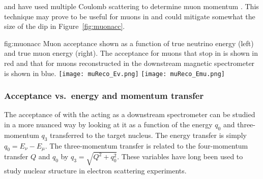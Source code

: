  and  have used multiple Coulomb scattering to determine muon momentum \cite{Abratenko:2017nki}.  
This technique may prove to be useful for muons in  and could  mitigate somewhat the size of the dip in Figure~\ref{fig:muonacc}.   


\begin{dunefigure}{fig:muonacc}
{Muon acceptance shown as a function of true neutrino energy (left) and true muon energy (right).  The acceptance for muons that stop in  is shown in red and that for muons reconstructed in the downstream magnetic spectrometer is shown in blue.}
      \texttt{[image: muReco\_Ev.png]}
      \texttt{[image: muReco\_Emu.png]}
\end{dunefigure}

\subsubsection{Acceptance vs.\ energy and momentum transfer}

The acceptance of  with the  acting as a downstream spectrometer can be studied in a more nuanced way by looking at it as a function of the energy $q_0$ and three-momentum $q_3$  transferred to the target nucleus. The energy transfer is simply $q_0=E_\nu - E_\mu$. The three-momentum transfer is related to the four-momentum transfer $Q$ and $q_0$ by $q_3 = \sqrt{Q^2 + q_0^2}$. These variables have long been used to study nuclear structure in electron scattering experiments. 

